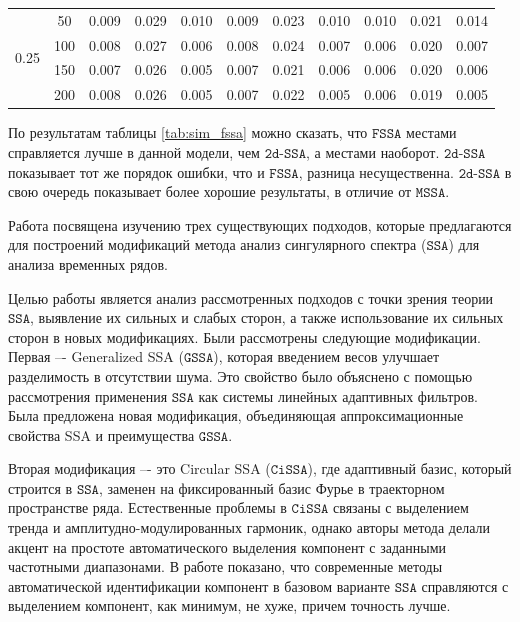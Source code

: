 \documentclass[12pt, specialist, subf
]{disser}
\theoremstyle{definition}
\newcommand{\SSA}{\texttt{SSA}}
\newcommand{\GSSA}{\texttt{GSSA}}
\newcommand{\CISSA}{\texttt{CiSSA}}
\newcommand{\MSSA}{\texttt{MSSA}}
\newcommand{\FSSA}{\texttt{FSSA}}
\newcommand{\DSSA}{\texttt{2d-SSA}}
\begin{document}
\begin{table}[H]
{\begin{tabular}{c|c|ccc|ccc|ccc}
		\midrule
		\multirow{4}{*}{0.25}         & 50                       & 0.009                       & 0.029                       & 0.010                      & 0.009  & 0.023 & 0.010 & 0.010  & 0.021 & 0.014 \\
		                              & 100                      & 0.008                       & 0.027                       & 0.006                      & 0.008  & 0.024 & 0.007 & 0.006  & 0.020 & 0.007 \\
		                              & 150                      & 0.007                       & 0.026                       & 0.005                      & 0.007  & 0.021 & 0.006 & 0.006  & 0.020 & 0.006 \\
		                              & 200                      & 0.008                       & 0.026                       & 0.005                      & 0.007  & 0.022 & 0.005 & 0.006  & 0.019 & 0.005 \\
		\bottomrule
	\end{tabular}
	}
\end{table}


По результатам таблицы \ref{tab:sim_fssa} можно сказать, что $\FSSA$ местами справляется лучше в данной модели, чем $\DSSA$, а местами наоборот. $\DSSA$ показывает тот же порядок ошибки, что и $\FSSA$, разница несущественна. $\DSSA$ в свою очередь показывает более хорошие результаты, в отличие от $\MSSA$.


\newpage



\conclusion
\label{sec:concl}


Работа посвящена изучению трех существующих подходов, которые предлагаются для построений модификаций метода анализ сингулярного спектра ($\SSA$) для анализа временных рядов. 

Целью работы является анализ рассмотренных подходов с точки зрения теории $\SSA$, выявление их сильных и слабых сторон, а также использование их сильных сторон в новых модификациях. Были рассмотрены следующие модификации. Первая –- Generalized SSA ($\GSSA$), которая введением весов улучшает разделимость в отсутствии шума. Это свойство было объяснено с помощью рассмотрения применения $\SSA$ как системы линейных адаптивных фильтров. Была предложена новая модификация, объединяющая аппроксимационные свойства SSA и преимущества $\GSSA$. 

Вторая модификация –- это Circular SSA ($\CISSA$), где адаптивный базис, который строится в $\SSA$, заменен на фиксированный базис Фурье в траекторном пространстве ряда. Естественные проблемы в $\CISSA$ связаны с выделением тренда и амплитудно-модулированных гармоник, однако авторы метода делали акцент на простоте автоматического выделения компонент с заданными частотными диапазонами. В работе показано, что современные методы автоматической идентификации компонент в базовом варианте $\SSA$ справляются с выделением компонент, как минимум, не хуже, причем точность лучше. 
\end{document}
